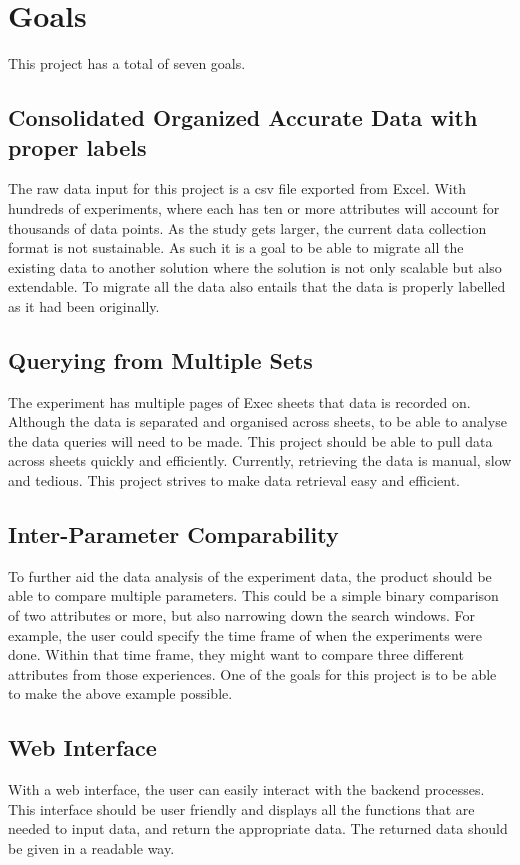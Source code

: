 \documentclass{article}
\begin{document}
\section{Goals}
This project has a total of seven goals.
\subsection*{Consolidated Organized Accurate Data with proper labels}
The raw data input for this project is a csv file exported from Excel. With hundreds of experiments,
where each has ten or more attributes will account for thousands of data points. As the study gets larger, the current data collection format is not sustainable.
As such it is a goal to be able to migrate all the existing data to another solution where the solution is not only scalable but also extendable.
To migrate all the data also entails that the data is properly labelled as it had been originally.


\subsection*{Querying from Multiple Sets}
The experiment has multiple pages of Exec sheets that data is recorded on. Although the data is separated and organised across sheets, to be able to analyse the data queries will need to be made.
This project should be able to pull data across sheets quickly and efficiently. Currently, retrieving the data is manual, slow and tedious.
This project strives to make data retrieval easy and efficient.  


\subsection*{Inter-Parameter Comparability}
To further aid the data analysis of the experiment data, the product should be able to compare multiple parameters.
This could be a simple binary comparison of two attributes or more, but also narrowing down the search windows.
For example, the user could specify the time frame of when the experiments were done. Within that time frame, they might want to compare three different attributes from those experiences.
One of the goals for this project is to be able to make the above example possible.


\subsection*{Web Interface}
With a web interface, the user can easily interact with the backend processes.
This interface should be user friendly and displays all the functions that are needed to input data, and return the appropriate data.
The returned data should be given in a readable way.
\end{document}
